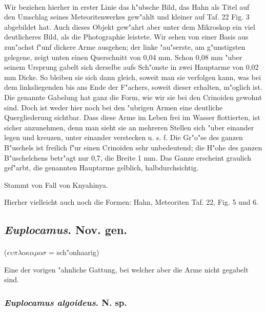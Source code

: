 \documentclass[a4paper, 11pt, oneside]{article}
\begin{document}
\paragraph{}
Wir beziehen hierher in erster Linie das h"ubsche Bild, das Hahn als Titel auf den Umschlag seines Meteoritenwerkes gew"ahlt und kleiner auf Taf. 22 Fig. 3 abgebildet hat. Auch dieses Objekt gew"ahrt aber unter dem Mikroskop ein viel deutlicheres Bild, als die Photographie leistete. Wir sehen von einer Basis aus zun"achst f"unf dickere Arme ausgehen; der linke "au"serste, am g"unstigsten gelegene, zeigt unten einen Querschnitt von 0,04 mm. Schon 0,08 mm "uber seinem Ursprung gabelt sich derselbe aufs Sch"onste in zwei Hauptarme von 0,02 mm Dicke. So bleiben sie sich dann gleich, soweit man sie verfolgen kann, was bei dem linksliegenden bis ans Ende der F"achers, soweit dieser erhalten, m"oglich ist. Die genannte Gabelung hat ganz die Form, wie wir sie bei den Crinoiden gewohnt sind. Doch ist weder hier noch bei den "ubrigen Armen eine deutliche Quergliederung sichtbar. Dass diese Arme im Leben frei im Wasser flottierten, ist sicher anzunehmen, denn man sieht sie an mehreren Stellen sich "uber einander legen und kreuzen, unter einander verstecken u. s. f. Die Gr"o"se des ganzen B"uschels ist freilich f"ur einen Crinoiden sehr unbedeutend; die H"ohe des ganzen B"uschelchens betr"agt nur 0,7, die Breite 1 mm. Das Ganze erscheint graulich gef"arbt, die genannten Hauptarme gelblich, halbdurchsichtig.

Stammt von Fall von Knyahinya.

Hierher vielleicht auch noch die Formen: Hahn, Meteoriten Taf. 22, Fig. 5 und 6.
\subsection{\emph{Euplocamus}. Nov. gen.}
\paragraph{}
($\epsilon\upsilon\pi\lambda$o$\kappa\alpha\mu$o$\sigma$ = sch"onhaarig)%

Eine der vorigen "ahnliche Gattung, bei welcher aber die Arme nicht gegabelt sind.
\subsubsection{\emph{Euplocamus algoideus}. N. sp.}
\end{document}
